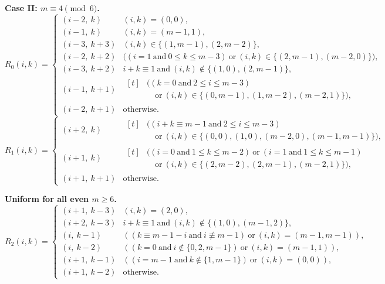 \medskip
\noindent\textbf{Case II: $m\equiv 4\pmod 6$.}
\[
R_0(i,k)=
\begin{cases}
(i-2,\ k) & (i,k)=(0,0),\\
(i-1,\ k) & (i,k)=(m-1,1),\\
(i-3,\ k+3) & (i,k)\in\{(1,m-1),(2,m-2)\},\\
(i-2,\ k+2) & \bigl( (i=1\ \text{and}\ 0\le k\le m-3)\ \text{or}\ (i,k)\in\{(2,m-1),(m-2,0)\} \bigr),\\
(i-3,\ k+2) & i+k\equiv 1\ \text{and}\ (i,k)\notin\{(1,0),(2,m-1)\},\\
(i-1,\ k+1) & \begin{aligned}[t]
              &\bigl( (k=0\ \text{and}\ 2\le i\le m-3)\\
              &\quad\text{or}\ (i,k)\in\{(0,m-1),(1,m-2),(m-2,1)\} \bigr),
              \end{aligned}\\[2.5ex]
(i-2,\ k+1) & \text{otherwise.}
\end{cases}
\]
\[
R_1(i,k)=
\begin{cases}
(i+2,\ k) & \begin{aligned}[t]
            &\bigl( (i+k\equiv m-1\ \text{and}\ 2\le i\le m-3)\\
            &\quad\text{or}\ (i,k)\in\{(0,0),(1,0),(m-2,0),(m-1,m-1)\} \bigr),
            \end{aligned}\\[2.5ex]
(i+1,\ k) & \begin{aligned}[t]
            &\bigl( (i=0\ \text{and}\ 1\le k\le m-2)\ \text{or}\ (i=1\ \text{and}\ 1\le k\le m-1)\\
            &\quad\text{or}\ (i,k)\in\{(2,m-2),(2,m-1),(m-2,1)\} \bigr),
            \end{aligned}\\[2.5ex]
(i+1,\ k+1) & \text{otherwise.}
\end{cases}
\]

\medskip
\noindent\textbf{Uniform for all even $m\ge 6$.}
\[
R_2(i,k)=
\begin{cases}
(i+1,\ k-3) & (i,k)=(2,0),\\
(i+2,\ k-3) & i+k\equiv 1\ \text{and}\ (i,k)\notin\{(1,0),(m-1,2)\},\\
(i,\ k-1) & ((k\equiv m-1-i\ \text{and}\ i\not\equiv m-1)\ \text{or}\ (i,k)=(m-1,m-1)),\\
(i,\ k-2) & ((k=0\ \text{and}\ i\notin\{0,2,m-1\})\ \text{or}\ (i,k)=(m-1,1)),\\
(i+1,\ k-1) & ((i=m-1\ \text{and}\ k\notin\{1,m-1\})\ \text{or}\ (i,k)=(0,0)),\\
(i+1,\ k-2) & \text{otherwise.}
\end{cases}
\]




